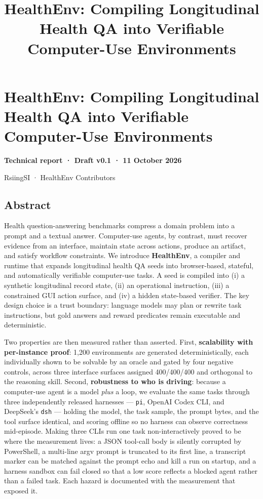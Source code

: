 \documentclass[
]{article}
\title{HealthEnv: Compiling Longitudinal Health QA into Verifiable
Computer-Use Environments}
\author{}
\date{}
\begin{document}
\maketitle

\section{HealthEnv: Compiling Longitudinal Health QA into Verifiable
Computer-Use
Environments}\label{healthenv-compiling-longitudinal-health-qa-into-verifiable-computer-use-environments}

\textbf{Technical report · Draft v0.1 · 11 October 2026}

{RsiingSI · HealthEnv Contributors}

\subsection{Abstract}\label{abstract}

Health question-answering benchmarks compress a domain problem into a
prompt and a textual answer. Computer-use agents, by contrast, must
recover evidence from an interface, maintain state across actions,
produce an artifact, and satisfy workflow constraints. We introduce
\textbf{HealthEnv}, a compiler and runtime that expands longitudinal
health QA seeds into browser-based, stateful, and automatically
verifiable computer-use tasks. A seed is compiled into (i) a synthetic
longitudinal record state, (ii) an operational instruction, (iii) a
constrained GUI action surface, and (iv) a hidden state-based verifier.
The key design choice is a trust boundary: language models may plan or
rewrite task instructions, but gold answers and reward predicates remain
executable and deterministic.

Two properties are then measured rather than asserted. First,
\textbf{scalability with per-instance proof}: 1,200 environments are
generated deterministically, each individually shown to be solvable by
an oracle and gated by four negative controls, across three interface
surfaces assigned 400/400/400 and orthogonal to the reasoning skill.
Second, \textbf{robustness to who is driving}: because a computer-use
agent is a model \emph{plus} a loop, we evaluate the same tasks through
three independently released harnesses --- \texttt{pi}, OpenAI Codex
CLI, and DeepSeek's \texttt{dsh} --- holding the model, the task sample,
the prompt bytes, and the tool surface identical, and scoring offline so
no harness can observe correctness mid-episode. Making three CLIs run
one task non-interactively proved to be where the measurement lives: a
JSON tool-call body is silently corrupted by PowerShell, a multi-line
argv prompt is truncated to its first line, a transcript marker can be
matched against the prompt echo and kill a run on startup, and a harness
sandbox can fail closed so that a low score reflects a blocked agent
rather than a failed task. Each hazard is documented with the
measurement that exposed it.
\end{document}
